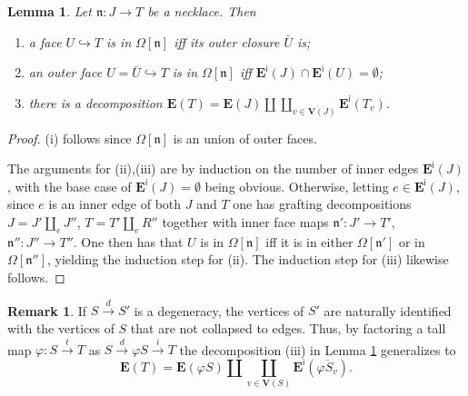 \documentclass[a4paper,10pt
,draft
]{article}%
\numberwithin{equation}{section}
\numberwithin{figure}{section}
\newtheorem{lemma}[equation]{Lemma}%
\theoremstyle{definition} %
\newtheorem{remark}[equation]{Remark}%
\newcommand{\1}{\ensuremath{\mathbbm 1}}%
\begin{document}
\begin{lemma}\label{FACEINNECK LEM}
	Let $\mathfrak{n} \colon J \to T$ be a necklace. Then
	\begin{enumerate}[label=(\roman*)]
		\item a face $U \hookrightarrow T$
		is in $\Omega[\mathfrak{n}]$
		iff its outer closure $\bar{U}$ is; 
		\item an outer face 
		$U = \bar{U} \hookrightarrow T$
		is in $\Omega[\mathfrak{n}]$ iff 
		$\boldsymbol{E}^{\mathsf{i}}(J) \cap 
		\boldsymbol{E}^{\mathsf{i}}(U) = \emptyset$;
		\item there is a decomposition
		$
		\boldsymbol{E}(T) = 
		\boldsymbol{E}(J) \amalg 
		\coprod_{v \in \boldsymbol{V}(J)}
		\boldsymbol{E}^{\mathsf{i}}(T_v)
		$.
	\end{enumerate}
\end{lemma}



\begin{proof}
	(i) follows since $\Omega[\mathfrak{n}]$ is an union of outer faces.
	
	The arguments for (ii),(iii) are by induction on the number of inner edges $\boldsymbol{E}^{\mathsf{i}}(J)$,
	with the base case of $\boldsymbol{E}^{\mathsf{i}}(J) = \emptyset$  being obvious.
%	
	Otherwise, letting $e \in \boldsymbol{E}^{\mathsf{i}}(J)$, since $e$ is an inner edge of
	both $J$ and $T$
	one has grafting decompositions
	$J = J' \amalg_e J''$,
	$T = T' \amalg_e R''$
	together with inner face maps
	$\mathfrak{n}' \colon J' \to T'$,
	$\mathfrak{n}'' \colon J'' \to T''$.
%
	One then has that 
	$U$ is in $\Omega[\mathfrak{n}]$
	iff it is in either
	$\Omega[\mathfrak{n}']$ or in $\Omega[\mathfrak{n}'']$,
	yielding the induction step for (ii).
	The induction step for (iii) likewise follows. 
\end{proof}



\begin{remark}
	If $S \xrightarrow{d} S'$
	is a degeneracy,
	the vertices of $S'$ are naturally identified with
	the vertices of $S$ that are not collapsed to edges.
	Thus, by factoring a tall map
	$\varphi \colon S \xrightarrow{t} T$ as
	$S \xrightarrow{d} \varphi S \xrightarrow{i} T$
	the decomposition (iii) in Lemma \ref{FACEINNECK LEM}
	generalizes to 
\begin{equation}\label{EDGEBREAK EQ}
	\boldsymbol{E}(T) = 
	\boldsymbol{E}(\varphi S) \amalg 
	\coprod_{v \in \boldsymbol{V}(S)}
	\boldsymbol{E}^{\mathsf{i}}(\overline{\varphi S_v}).
\end{equation}
\end{remark}
\end{document}
